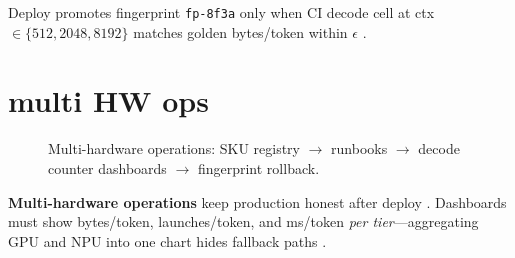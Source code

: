 \begin{example}
Deploy promotes fingerprint \texttt{fp-8f3a} only when CI decode cell at ctx$\in\{512,2048,8192\}$ matches golden bytes/token within $\epsilon$ \citep{memoryfloor2026,taxbreak2026,yirage2026,chen2020compilerbasedhardw,patel2025llminference,kwon2023vllm,liu2024deepseekv3,amd2024aie,dlbook,dao2023flashdecoding,nvidia2024cudagraphs,nvidia2022hopper,semianalysis2024tma,amd2024xdna,dao2022flashattention}.
\end{example}

\section{multi HW ops}
\label{sec:ch26_multi_hw_ops}


\begin{figure}[t]
\centering
{}
\caption{Multi-hardware operations: SKU registry $\rightarrow$ runbooks $\rightarrow$ decode counter dashboards $\rightarrow$ fingerprint rollback.}
\label{fig:multi_hw_ops_architecture}
\end{figure}

\textbf{Multi-hardware operations} keep production honest after deploy \citep{patel2025llminference,yirage2026,chen2020compilerbasedhardw,amd2024xdna,amd2024aie,dlbook,kwon2023vllm,liu2024deepseekv3,memoryfloor2026,taxbreak2026,semianalysis2024tma,dao2022flashattention,dao2023flashdecoding,nvidia2024cudagraphs,nvidia2022hopper}. Dashboards must show bytes/token, launches/token, and ms/token \emph{per tier}---aggregating GPU and NPU into one chart hides fallback paths \citep{patel2025llminference,memoryfloor2026,taxbreak2026,yirage2026,chen2020compilerbasedhardw,kwon2023vllm,liu2024deepseekv3,amd2024aie,dlbook,semianalysis2024tma,amd2024xdna,dao2022flashattention,dao2023flashdecoding,nvidia2024cudagraphs,nvidia2022hopper}.

